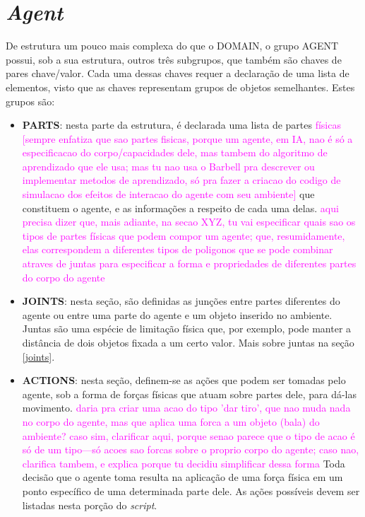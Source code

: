 \documentclass[cic,tc]{iiufrgs}
\newcommand\bruno[1]{\textcolor{magenta}{#1}}
\begin{document}
    \section{\textit{Agent}}
    De estrutura um pouco mais complexa do que o DOMAIN, o grupo AGENT possui, sob a sua estrutura, outros três subgrupos, que também são chaves de pares chave/valor.
    Cada uma dessas chaves requer a declaração de uma lista de elementos, visto que as chaves representam grupos de objetos semelhantes. Estes grupos são:
    \begin{itemize}
      \item \textbf{PARTS}: nesta parte da estrutura, é declarada uma lista de partes \bruno{físicas [sempre enfatiza que sao partes fisicas, porque um agente, em IA, nao é só a especificacao do corpo/capacidades dele, mas tambem do algoritmo de aprendizado que ele usa; mas tu nao usa o Barbell pra descrever ou implementar metodos de aprendizado, só pra fazer a criacao do codigo de simulacao dos efeitos de interacao do agente com seu ambiente]} que constituem o agente, e as informações a respeito de cada uma delas. \bruno{aqui precisa dizer que, mais adiante, na secao XYZ, tu vai especificar quais sao os tipos de partes físicas que podem compor um agente; que, resumidamente, elas correspondem a diferentes tipos de poligonos que se pode combinar atraves de juntas para especificar a forma e propriedades de diferentes partes do corpo do agente}
      \item \textbf{JOINTS}: nesta seção, são definidas as junções entre partes diferentes do agente ou entre uma parte do agente e um objeto inserido no ambiente. Juntas
      são uma espécie de limitação física que, por exemplo, pode manter a distância de dois objetos fixada a um certo valor. Mais sobre juntas na seção \ref{joints}.
      \item \textbf{ACTIONS}: nesta seção, definem-se as ações que podem ser tomadas pelo agente, sob a forma de forças físicas que atuam sobre partes dele,
      para dá-las movimento. \bruno{daria pra criar uma acao do tipo 'dar tiro', que nao muda nada no corpo do agente, mas que aplica uma forca a um objeto (bala) do ambiente? caso sim, clarificar aqui, porque senao parece que o tipo de acao é só de um tipo---só acoes sao forcas sobre o proprio corpo do agente; caso nao, clarifica tambem, e explica porque tu decidiu simplificar dessa forma} Toda decisão que o agente toma resulta na aplicação de uma força física em um ponto específico de uma determinada parte dele. As ações
      possíveis devem ser listadas nesta porção do \textit{script}.
    \end{itemize}
\end{document}

